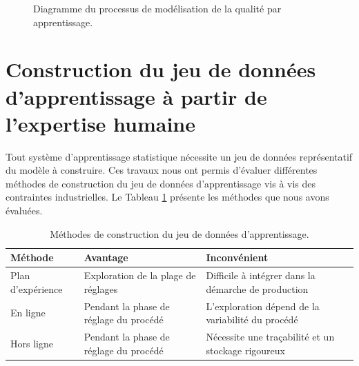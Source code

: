 \begin{figure}[hbtp]
    \caption{Diagramme du processus de modélisation de la qualité par apprentissage.}
    \label{fig:deep_flowchart}
\end{figure}

\vfill
\newpage

\section{Construction du jeu de données d'apprentissage à partir de l'expertise humaine} \label{sec:dataset}
Tout système d'apprentissage statistique nécessite un jeu de données représentatif du modèle à construire.
Ces travaux nous ont permis d'évaluer différentes méthodes de construction du jeu de données d'apprentissage vis à vis des contraintes industrielles.
Le Tableau \ref{tab:dataset} présente les méthodes que nous avons évaluées.

\begin{table}[]
    \hspace*{-8mm}
    \begin{tabular}{|l|l|l|}
        \arrayrulecolor{black}
        \hline
        Méthode           & Avantage                                           & Inconvénient                                        \\ \hline
        \hline
        Plan d’expérience & Exploration de la plage de réglages  & Difficile à intégrer dans la démarche de production \\ \hline
        En ligne          & Pendant la phase de réglage du procédé & L’exploration dépend de la variabilité du procédé    \\ \hline
        Hors ligne        & Pendant la phase de réglage du procédé & Nécessite une traçabilité et un stockage rigoureux \\ \hline
    \end{tabular}
    \caption{Méthodes de construction du jeu de données d'apprentissage.}
    \label{tab:dataset}
\end{table}

